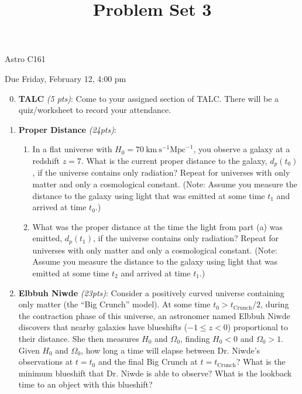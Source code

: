 \documentclass[12pt,preprint]{aastex}
\title{Problem Set 3}
\def\Mpc{\mathrm{Mpc}}
\def\km{\mathrm{km}}
\def\s{\mathrm{s}}
\begin{document}
\maketitle
\centerline{Astro C161} 

\centerline{Due Friday, February 12, 4:00 pm}

\begin{enumerate}
\setcounter{enumi}{-1}

\item \textbf{TALC} \textit{(5 pts)}: Come to your assigned section of TALC. There will be a quiz/worksheet to record your attendance.

\item \textbf{Proper Distance} \textit{(24pts)}: 
	\begin{enumerate}
	\item In a flat universe with $H_0 = 70\ \km~\s^{-1} \Mpc^{-1}$, you observe a galaxy at a redshift $z=7$. What is the current proper distance to the galaxy, $d_p(t_0)$, if the universe contains only radiation? Repeat for universes with only matter and only a cosmological constant. (Note: Assume you measure the distance to the galaxy using light that was emitted at some time $t_1$ and arrived at time $t_0$.)
	\item What was the proper distance at the time the light from part (a) was emitted, $d_p(t_1)$, if the universe contains only radiation? Repeat for universes with only matter and only a cosmological constant. (Note: Assume you measure the distance to the galaxy using light that was emitted at some time $t_2$ and arrived at time $t_1$.)
	\end{enumerate}

\item \textbf{Elbbuh Niwde} \textit{(23pts)}: Consider a positively curved universe containing only matter (the ``Big Crunch'' model). At some time $t_0 > t_{\mathrm{Crunch}}/2$, during the contraction phase of this universe, an astronomer named Elbbuh Niwde discovers that nearby galaxies have blueshifts ($-1 \leq z < 0$) proportional to their distance. She then measures $H_0$ and $\Omega_0$, finding $H_0 < 0$ and $\Omega_0 > 1$. Given $H_0$ and $\Omega_0$, how long a time will elapse between Dr. Niwde's observations at $t=t_0$ and the final Big Crunch at $t=t_{\mathrm{Crunch}}$? What is the minimum blueshift that Dr. Niwde is able to observe? What is the lookback time to an object with this blueshift?


\end{enumerate}
\end{document}
